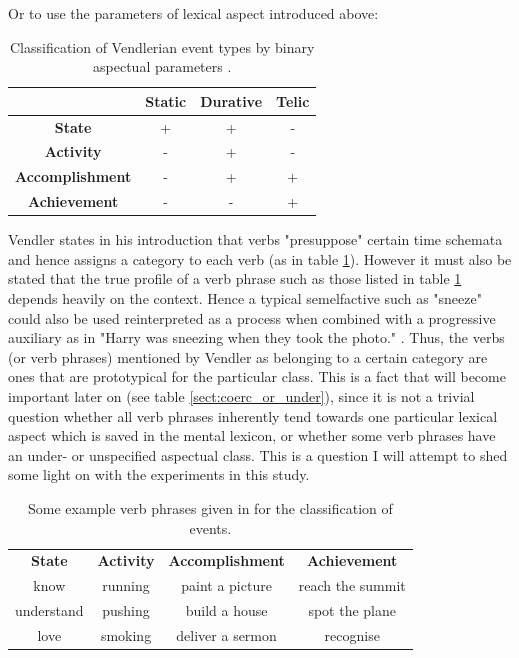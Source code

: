 Or to use the parameters of lexical aspect introduced above:
\begin{table}[h]
    \centering
    \begin{tabular}{|c||c|c|c|}
        \hline
                                & Static & Durative & Telic \\ \hline
        \textbf{State}          & +      & +        & - \\ \hline
        \textbf{Activity}       & -      & +        & - \\ \hline
        \textbf{Accomplishment} & -      & +        & + \\ \hline
        \textbf{Achievement}    & -      & -        & + \\ \hline
    \end{tabular}
    \caption{Classification of Vendlerian event types by binary aspectual parameters \citep{Smith1991ThePO}.}
\end{table}

Vendler states in his introduction that verbs "presuppose" certain time schemata and hence assigns a category to each verb (as in table \ref{table:vendlerverbs}). However it must also be stated that the true profile of a verb phrase such as those listed in table \ref{table:vendlerverbs} depends heavily on the context. Hence a typical semelfactive such as "sneeze" could also be used reinterpreted as a process when combined with a progressive auxiliary as in "Harry was sneezing when they took the photo." \citep{moens-steedman-1988-temporal}. Thus, the verbs (or verb phrases) mentioned by Vendler as belonging to a certain category are ones that are prototypical for the particular class. This is a fact that will become important later on (see table \ref{sect:coerc_or_under}), since it is not a trivial question whether all verb phrases inherently tend towards one particular lexical aspect which is saved in the mental lexicon, or whether some verb phrases have an under- or unspecified aspectual class. This is a question I will attempt to shed some light on with the experiments in this study.

\begin{table}
    \centering
    \begin{tabular}{|c|c|c|c|}
        
        \textbf{State} & \textbf{Activity} & \textbf{Accomplishment} & \textbf{Achievement} \\
        know & running & paint a picture & reach the summit \\
        understand & pushing & build a house & spot the plane \\
        love & smoking & deliver a sermon & recognise
    \end{tabular}
    \caption{Some example verb phrases given in \citet{vendler57} for the classification of events.}
    \label{table:vendlerverbs}
\end{table}



